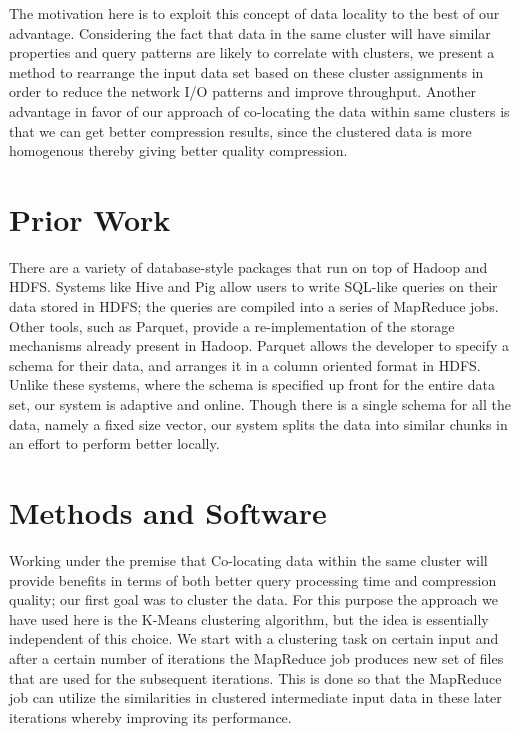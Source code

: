 \documentclass[paper=letter, fontsize=11pt]{scrartcl}
\numberwithin{equation}{section}		%
\numberwithin{figure}{section}			%
\numberwithin{table}{section}				%
\begin{document}
The motivation here is to exploit this concept of data locality to the best of our advantage.  Considering the fact that data in the same cluster will have similar properties and query patterns are likely to correlate with clusters, we present a method to rearrange the input data set based on these cluster assignments in order to reduce the network I/O patterns and improve throughput. Another advantage in favor of our approach of co-locating the data within same clusters is that we can get better compression results, since the clustered data is more homogenous thereby giving better quality compression.


\section{Prior Work}
There are a variety of database-style packages that run on top of Hadoop and HDFS.  Systems like Hive and Pig allow users to write SQL-like queries on their data stored in HDFS; the queries are compiled into a series of MapReduce jobs.  Other tools, such as Parquet, provide a re-implementation of the storage mechanisms already present in Hadoop.  Parquet allows the developer to specify a schema for their data, and arranges it in a column oriented format in HDFS. \\

Unlike these systems, where the schema is specified up front for the entire data set, our system is adaptive and online.  Though there is a single schema for all the data, namely a fixed size vector, our system splits the data into similar chunks in an effort to perform better locally.


\section{Methods and Software}

Working under the premise that Co-locating data within the same cluster will provide benefits in terms of both better query processing time and compression quality; our first goal was to cluster the data. For this purpose the approach we have used here is the K-Means clustering algorithm, but the idea is essentially independent of this choice. We start with a clustering task on certain input and after a certain number of iterations the MapReduce job produces new set of files that are used for the subsequent iterations. This is done so that the MapReduce job can utilize the similarities in clustered intermediate input data in these later iterations whereby improving its performance. \\
\end{document}
